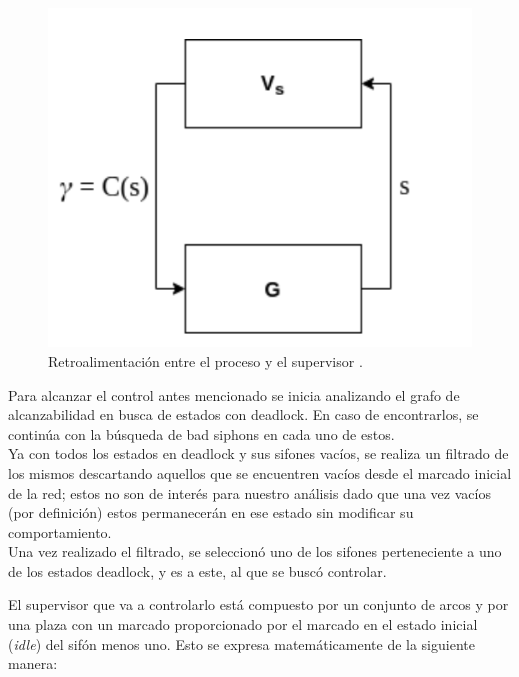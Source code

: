 \begin{figure}[H]
	\centering 
	\includegraphics[scale=0.45]{Figures/algoritmo3/desarrollo/retroalimentacion.png} 
	\caption[Retroalimentación entre el  proceso y el supervisor]{Retroalimentación entre el  proceso y el supervisor \footnotemark.}
	\label{fig:fig3.4}
  \end{figure} 
  
Para alcanzar el control antes mencionado se inicia analizando el grafo de alcanzabilidad en busca de estados con deadlock. En caso de encontrarlos, se continúa con la búsqueda de bad siphons en cada uno de estos.  \\
Ya con todos los estados en deadlock y sus sifones vacíos, se realiza un filtrado de los mismos descartando aquellos que se encuentren vacíos desde el marcado inicial de la red; estos no son de interés para nuestro análisis dado que una vez vacíos (por definición) estos permanecerán en ese estado sin modificar su comportamiento. \\
Una vez realizado el filtrado, se seleccionó uno de los sifones perteneciente a uno de los estados deadlock, y es a este, al que se buscó controlar.

El supervisor que va a controlarlo está compuesto por un conjunto de arcos y por una plaza con un marcado proporcionado por el marcado en el estado inicial (\textit{idle}) del sifón menos uno.
Esto se expresa matemáticamente de la siguiente manera: 


